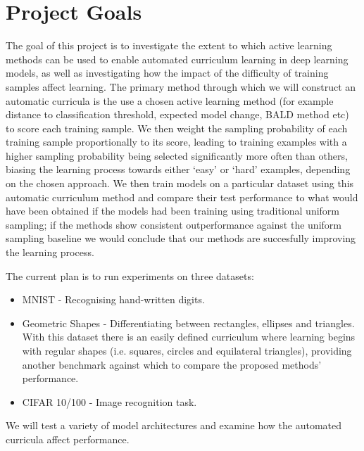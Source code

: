 \documentclass[a4paper,10pt]{article}
\begin{document}
\section{Project Goals}
The goal of this project is to investigate the extent to which active learning methods can be used to enable automated curriculum learning in deep learning models, as well as investigating how the impact of the difficulty of training samples affect learning. The primary method through which we will construct an automatic curricula is the use a chosen active learning method (for example distance to classification threshold, expected model change, BALD method etc) to score each training sample. We then weight the sampling probability of each training sample proportionally to its score, leading to training examples with a higher sampling probability being selected significantly more often than others, biasing the learning process towards either `easy' or `hard' examples, depending on the chosen approach. We then train models on a particular dataset using this automatic curriculum method and compare their test performance to what would have been obtained if the models had been training using traditional uniform sampling; if the methods show consistent outperformance against the uniform sampling baseline we would conclude that our methods are succesfully improving the learning process.

The current plan is to run experiments on three datasets:
\begin{itemize}
\item MNIST - Recognising hand-written digits.
\item Geometric Shapes - Differentiating between rectangles, ellipses and triangles. With this dataset there is an easily defined curriculum where learning begins with regular shapes (i.e. squares, circles and equilateral triangles), providing another benchmark against which to compare the proposed methods' performance.
\item CIFAR 10/100 - Image recognition task.
\end{itemize}
We will test a variety of model architectures and examine how the automated curricula affect performance.
\end{document}
